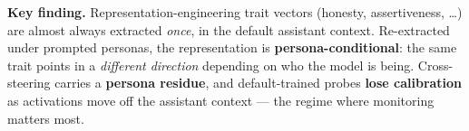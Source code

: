 \documentclass{article}
\newcommand{\postertitle}[1]{{\fontsize{54}{60}\selectfont\bfseries\color{white}#1}}
\newcommand{\postersub}[1]{{\fontsize{27}{33}\selectfont\color{white}#1}}
\newcommand{\posterauthor}[1]{{\fontsize{26}{32}\selectfont\color{white}#1}}
\newcommand{\posterinst}[1]{{\fontsize{21}{27}\selectfont\color{white!82}#1}}
\newcommand{\bodysize}{\fontsize{21}{26}\selectfont\color{ink}}
\newcommand{\hl}[1]{{\color{midblue}\textbf{#1}}}
\begin{document}
\noindent
{}

\begin{calloutbox}
\bodysize
{\color{midblue}\textbf{Key finding.}}
Representation-engineering trait vectors (honesty, assertiveness, \ldots) are almost always extracted \emph{once}, in the default assistant context. Re-extracted under prompted personas, the representation is \hl{persona-conditional}: the same trait points in a \emph{different direction} depending on who the model is being. Cross-steering carries a \hl{persona residue}, and default-trained probes \hl{lose calibration} as activations move off the assistant context --- the regime where monitoring matters most.
\end{calloutbox}
\end{document}
